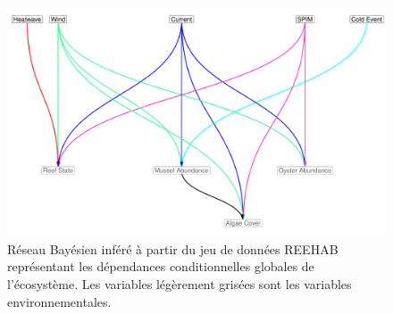 \documentclass[12pt]{report}
\begin{document}
\begin{figure}[h]
    \centering
    \includegraphics[width = .9\linewidth]{bn_report.pdf}
    \caption[Réseau Bayésien représentant les dépendances conditionnelles de l'écosystème étudié]{Réseau Bayésien inféré à partir du jeu de données REEHAB représentant les dépendances conditionnelles globales de l'écosystème. Les variables légèrement grisées sont les variables environnementales.}
    \label{fig:7}
\end{figure}
\end{document}
